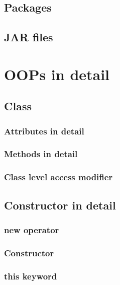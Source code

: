 \documentclass[14pt,fleqn]{extbook} %
\begin{document}
\section{Packages}

\section{JAR files}



\chapter{OOPs in detail}
\section{Class}

\subsection{Attributes in detail}

\subsection{Methods in detail}

\subsection{Class level access modifier}

\section{Constructor in detail}
%
\subsection{new operator}

\subsection{Constructor}

\subsection{this keyword}

\end{document}
